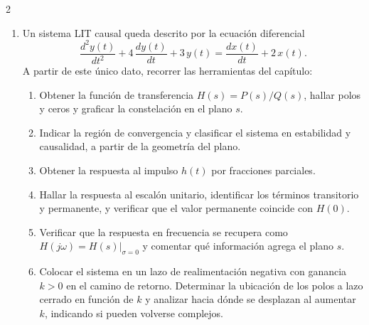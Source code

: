 \documentclass[10pt,a4paper]{article}
\begin{document}
\begin{multicols}{2}
\begin{enumerate}
			\textbf{Ejercicio integrador}
			\item Un sistema LIT causal queda descrito por la ecuación diferencial
			\[
				\frac{d^2 y(t)}{dt^2} + 4\,\frac{d y(t)}{dt} + 3\,y(t) = \frac{d x(t)}{dt} + 2\,x(t).
			\]
			A partir de este único dato, recorrer las herramientas del capítulo:
			\begin{enumerate}
				\item Obtener la función de transferencia $H(s) = P(s)/Q(s)$, hallar polos y ceros y graficar la constelación en el plano $s$.
				\item Indicar la región de convergencia y clasificar el sistema en estabilidad y causalidad, a partir de la geometría del plano.
				\item Obtener la respuesta al impulso $h(t)$ por fracciones parciales.
				\item Hallar la respuesta al escalón unitario, identificar los términos transitorio y permanente, y verificar que el valor permanente coincide con $H(0)$.
				\item Verificar que la respuesta en frecuencia se recupera como $H(j\omega) = \left. H(s)\right|_{\sigma = 0}$ y comentar qué información agrega el plano $s$.
				\item Colocar el sistema en un lazo de realimentación negativa con ganancia $k > 0$ en el camino de retorno. Determinar la ubicación de los polos a lazo cerrado en función de $k$ y analizar hacia dónde se desplazan al aumentar $k$, indicando si pueden volverse complejos.
			\end{enumerate}

		\end{enumerate}

	\end{multicols}
\end{document}
